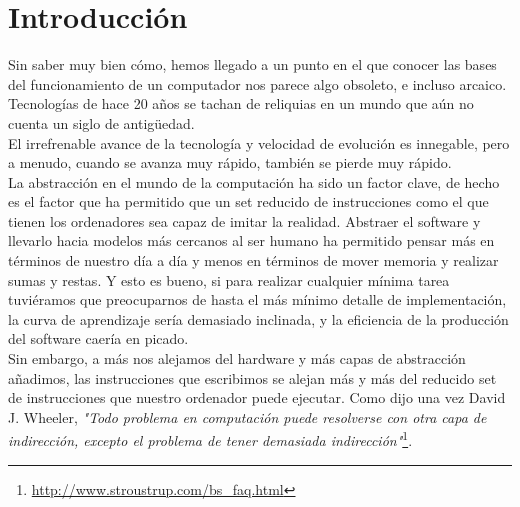 
\chapter{Introducción}

Sin saber muy bien cómo, hemos llegado a un punto en el que conocer las bases del funcionamiento de un computador nos parece algo obsoleto, e incluso arcaico. Tecnologías de hace 20 años se tachan de reliquias en un mundo que aún no cuenta un siglo de antigüedad.\\

El irrefrenable avance de la tecnología y velocidad de evolución es innegable, pero a menudo, cuando se avanza muy rápido, también se pierde muy rápido.\\

La abstracción en el mundo de la computación ha sido un factor clave, de hecho es el factor que ha permitido que un set reducido de instrucciones como el que tienen los ordenadores sea capaz de imitar la realidad. Abstraer el software y llevarlo hacia modelos más cercanos al ser humano ha permitido pensar más en términos de nuestro día a día y menos en términos de mover memoria y realizar sumas y restas. Y esto es bueno, si para realizar cualquier mínima tarea tuviéramos que preocuparnos de hasta el más mínimo detalle de implementación, la curva de aprendizaje sería demasiado inclinada, y la eficiencia de la producción del software caería en picado.\\

Sin embargo, a más nos alejamos del hardware y más capas de abstracción añadimos, las instrucciones que escribimos se alejan más y más del reducido set de instrucciones que nuestro ordenador puede ejecutar. Como dijo una vez David J. Wheeler, \emph{"Todo problema en computación puede resolverse con otra capa de indirección, excepto el problema de tener demasiada indirección"}\footnote{\url{http://www.stroustrup.com/bs_faq.html}}.\\

